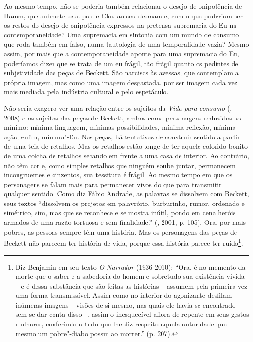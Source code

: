 Ao mesmo tempo, não se poderia também relacionar o desejo de onipotência
de Hamm, que submete seus pais e Clov ao seu desmande, com o que
poderiam ser os restos do desejo de onipotência expressos na pretensa
supremacia do Eu na contemporaneidade? Uma supremacia em sintonia com um
mundo de consumo que roda também em falso, numa tautologia de uma
temporalidade vazia? Mesmo assim, por mais que a contemporaneidade
aponte para uma supremacia do Eu, poderíamos dizer que se trata de um eu
frágil, tão frágil quanto os pedintes de subjetividade das peças de
Beckett. São narcisos às avessas, que contemplam a própria imagem, mas
como uma imagem desgastada, por ser imagem cada vez mais mediada pela
indústria cultural e pelo espetáculo.

Não seria exagero ver uma relação entre os sujeitos da \emph{Vida para
consumo} (, 2008) e os sujeitos das peças de Beckett, ambos como
personagens reduzidos ao mínimo: mínima linguagem, mínimas
possibilidades, mínima reflexão, mínima ação, enfim, mínimo"-Eu. Nas
peças, há tentativas de construir sentido a partir de uma teia de
retalhos. Mas os retalhos estão longe de ter aquele colorido bonito de
uma colcha de retalhos secando em frente a uma casa de interior. Ao
contrário, não têm cor e, como simples retalhos que ninguém soube
juntar, permanecem incongruentes e cinzentos, sua tessitura é frágil. Ao
mesmo tempo em que os personagens se falam mais para permanecer vivos do
que para transmitir qualquer sentido. Como diz Fábio Andrade, as
palavras se dissolvem com Beckett, seus textos ``dissolvem os projetos
em palavrório, burburinho, rumor, ordenado e simétrico, sim, mas que se
reconhece e se mostra inútil, pondo em cena heróis armados de uma razão
tortuosa e sem finalidade.'' (, 2001, p. 105). Ora, por mais
pobres, as pessoas sempre têm uma história. Mas os personagens das peças
de Beckett não parecem ter história de vida, porque essa história parece
ter ruído\footnote{Diz Benjamin em seu texto \emph{O Narrador}
  (1936-2010): ``Ora, é no momento da morte que o saber e a sabedoria do
  homem e sobretudo sua existência vivida -- e é dessa substância que
  são feitas as histórias -- assumem pela primeira vez uma forma
  transmissível. Assim como no interior do agonizante desfilam inúmeras
  imagens -- visões de si mesmo, nas quais ele havia se encontrado sem
  se dar conta disso --, assim o inesquecível aflora de repente em seus
  gestos e olhares, conferindo a tudo que lhe diz respeito aquela
  autoridade que mesmo um pobre"-diabo possui ao morrer.'' (p. 207).}.

